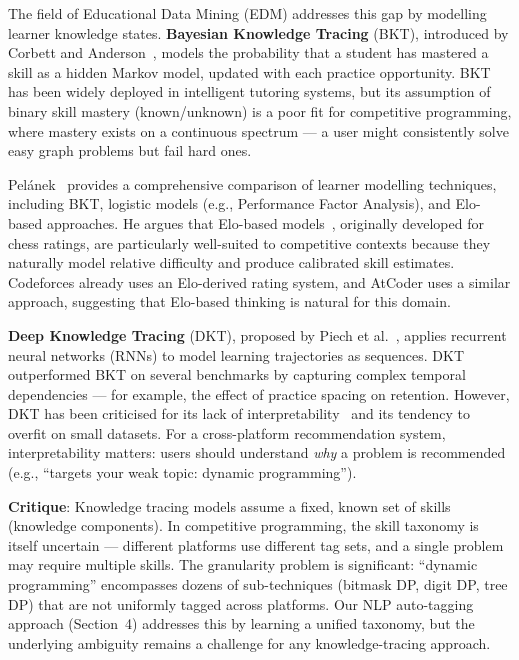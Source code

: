 \documentclass[12pt,a4paper]{article}
\begin{document}
The field of Educational Data Mining (EDM) addresses this gap by modelling learner knowledge states. \textbf{Bayesian Knowledge Tracing} (BKT), introduced by Corbett and Anderson~\cite{corbett1994}, models the probability that a student has mastered a skill as a hidden Markov model, updated with each practice opportunity. BKT has been widely deployed in intelligent tutoring systems, but its assumption of binary skill mastery (known/unknown) is a poor fit for competitive programming, where mastery exists on a continuous spectrum --- a user might consistently solve easy graph problems but fail hard ones.

Pel\'{a}nek~\cite{pelanek2017} provides a comprehensive comparison of learner modelling techniques, including BKT, logistic models (e.g., Performance Factor Analysis), and Elo-based approaches. He argues that Elo-based models~\cite{elo1978}, originally developed for chess ratings, are particularly well-suited to competitive contexts because they naturally model relative difficulty and produce calibrated skill estimates. Codeforces already uses an Elo-derived rating system, and AtCoder uses a similar approach, suggesting that Elo-based thinking is natural for this domain.

\textbf{Deep Knowledge Tracing} (DKT), proposed by Piech et al.~\cite{piech2015}, applies recurrent neural networks (RNNs) to model learning trajectories as sequences. DKT outperformed BKT on several benchmarks by capturing complex temporal dependencies --- for example, the effect of practice spacing on retention. However, DKT has been criticised for its lack of interpretability~\cite{xiong2016} and its tendency to overfit on small datasets. For a cross-platform recommendation system, interpretability matters: users should understand \emph{why} a problem is recommended (e.g., ``targets your weak topic: dynamic programming'').

\textbf{Critique}: Knowledge tracing models assume a fixed, known set of skills (knowledge components). In competitive programming, the skill taxonomy is itself uncertain --- different platforms use different tag sets, and a single problem may require multiple skills. The granularity problem is significant: ``dynamic programming'' encompasses dozens of sub-techniques (bitmask DP, digit DP, tree DP) that are not uniformly tagged across platforms. Our NLP auto-tagging approach (Section~4) addresses this by learning a unified taxonomy, but the underlying ambiguity remains a challenge for any knowledge-tracing approach.
\end{document}
